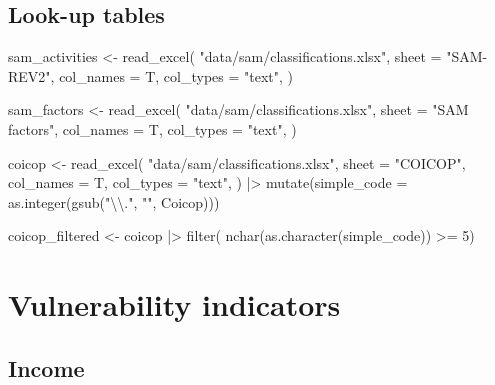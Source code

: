 \documentclass[
  letterpaper,
  DIV=11,
  numbers=noendperiod]{scrartcl}
\newenvironment{Shaded}{}{}
\newcommand{\AttributeTok}[1]{\textcolor[rgb]{0.84,0.23,0.29}{#1}}
\newcommand{\DecValTok}[1]{\textcolor[rgb]{0.00,0.36,0.77}{#1}}
\newcommand{\FunctionTok}[1]{\textcolor[rgb]{0.44,0.26,0.76}{#1}}
\newcommand{\NormalTok}[1]{\textcolor[rgb]{0.14,0.16,0.18}{#1}}
\newcommand{\OtherTok}[1]{\textcolor[rgb]{0.44,0.26,0.76}{#1}}
\newcommand{\SpecialCharTok}[1]{\textcolor[rgb]{0.00,0.36,0.77}{#1}}
\newcommand{\StringTok}[1]{\textcolor[rgb]{0.01,0.18,0.38}{#1}}
\begin{document}
\subsection{Look-up tables}\label{look-up-tables}

\begin{Shaded}
\begin{Highlighting}[]
\NormalTok{sam\_activities }\OtherTok{\textless{}{-}} \FunctionTok{read\_excel}\NormalTok{(}
    \StringTok{"data/sam/classifications.xlsx"}\NormalTok{,}
    \AttributeTok{sheet =} \StringTok{"SAM{-}REV2"}\NormalTok{,}
    \AttributeTok{col\_names =}\NormalTok{ T,}
    \AttributeTok{col\_types =} \StringTok{"text"}\NormalTok{,}
\NormalTok{  )}

\NormalTok{sam\_factors }\OtherTok{\textless{}{-}} \FunctionTok{read\_excel}\NormalTok{(}
    \StringTok{"data/sam/classifications.xlsx"}\NormalTok{,}
    \AttributeTok{sheet =} \StringTok{"SAM factors"}\NormalTok{,}
    \AttributeTok{col\_names =}\NormalTok{ T,}
    \AttributeTok{col\_types =} \StringTok{"text"}\NormalTok{,}
\NormalTok{  )}

\NormalTok{coicop }\OtherTok{\textless{}{-}} \FunctionTok{read\_excel}\NormalTok{(}
    \StringTok{"data/sam/classifications.xlsx"}\NormalTok{,}
    \AttributeTok{sheet =} \StringTok{"COICOP"}\NormalTok{,}
    \AttributeTok{col\_names =}\NormalTok{ T,}
    \AttributeTok{col\_types =} \StringTok{"text"}\NormalTok{,}
\NormalTok{  ) }\SpecialCharTok{|\textgreater{}} 
  \FunctionTok{mutate}\NormalTok{(}\AttributeTok{simple\_code =} \FunctionTok{as.integer}\NormalTok{(}\FunctionTok{gsub}\NormalTok{(}\StringTok{"}\SpecialCharTok{\textbackslash{}\textbackslash{}}\StringTok{."}\NormalTok{, }\StringTok{""}\NormalTok{, Coicop)))}

\NormalTok{coicop\_filtered }\OtherTok{\textless{}{-}}\NormalTok{ coicop }\SpecialCharTok{|\textgreater{}} 
  \FunctionTok{filter}\NormalTok{( }\FunctionTok{nchar}\NormalTok{(}\FunctionTok{as.character}\NormalTok{(simple\_code)) }\SpecialCharTok{\textgreater{}=} \DecValTok{5}\NormalTok{)}
\end{Highlighting}
\end{Shaded}

\section{Vulnerability indicators}\label{vulnerability-indicators}

\subsection{Income}\label{income}
\end{document}
